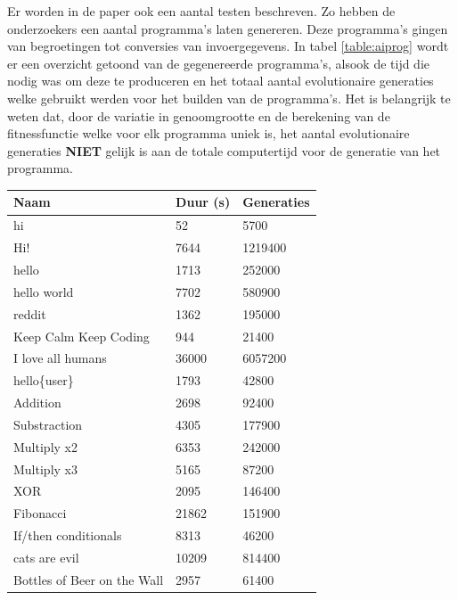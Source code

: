 Er worden in de paper ook een aantal testen beschreven. Zo hebben de onderzoekers een aantal programma’s laten genereren. Deze programma’s gingen van begroetingen tot conversies van invoergegevens. In tabel \ref{table:aiprog} wordt er een overzicht getoond van de gegenereerde programma’s, alsook de tijd die nodig was om deze te produceren en het totaal aantal evolutionaire generaties welke gebruikt werden voor het builden van de programma’s. Het is belangrijk te weten dat, door de variatie in genoomgrootte en de berekening van de fitnessfunctie welke voor elk programma uniek is, het aantal evolutionaire generaties \textbf{NIET} gelijk is aan de totale computertijd voor de generatie van het programma.

\begin{table}[htb]
	\centering
	\begin{tabular}{lll}
		\hline
		Naam                        & Duur (s) & Generaties \\ \hline
		hi                          & 52       & 5700       \\
		Hi!                         & 7644     & 1219400    \\
		hello                       & 1713     & 252000     \\
		hello world                 & 7702     & 580900     \\
		reddit                      & 1362     & 195000     \\
		Keep Calm Keep Coding       & 944      & 21400      \\
		I love all humans           & 36000    & 6057200    \\
		hello\{user\}               & 1793     & 42800      \\
		Addition                    & 2698     & 92400      \\
		Substraction                & 4305     & 177900     \\
		Multiply x2                 & 6353     & 242000     \\
		Multiply x3                 & 5165     & 87200      \\
		XOR                         & 2095     & 146400     \\
		Fibonacci                   & 21862    & 151900     \\
		If/then conditionals        & 8313     & 46200      \\
		cats are evil               & 10209    & 814400     \\
		Bottles of Beer on the Wall & 2957     & 61400      \\

\end{tabular}
\end{table}
